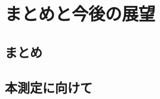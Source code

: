 \documentclass[../master]{subfiles}
\begin{document}
\chapter{まとめと今後の展望}
\section{まとめ}

\section{本測定に向けて}
\end{document}
